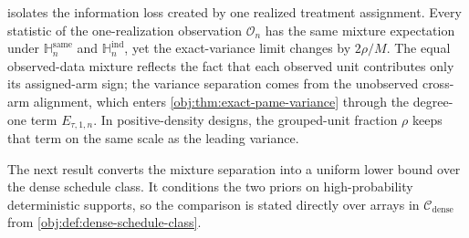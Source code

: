 \documentclass[11pt]{article}
\begin{document}
 isolates the information loss created by one realized treatment assignment. Every statistic of the one-realization observation \(\mathcal O_n\) has the same mixture expectation under \(\mathbb H_n^{\mathrm{same}}\) and \(\mathbb H_n^{\mathrm{ind}}\), yet the exact-variance limit changes by \(2\rho/M\). The equal observed-data mixture reflects the fact that each observed unit contributes only its assigned-arm sign; the variance separation comes from the unobserved cross-arm alignment, which enters \cref{obj:thm:exact-pame-variance} through the degree-one term \(E_{\tau,1,n}\). In positive-density designs, the grouped-unit fraction \(\rho\) keeps that term on the same scale as the leading variance.

The next result converts the mixture separation into a uniform lower bound over the dense schedule class. It conditions the two priors on high-probability deterministic supports, so the comparison is stated directly over arrays in \(\mathcal C_{\mathrm{dense}}\) from \cref{obj:def:dense-schedule-class}.
\end{document}
